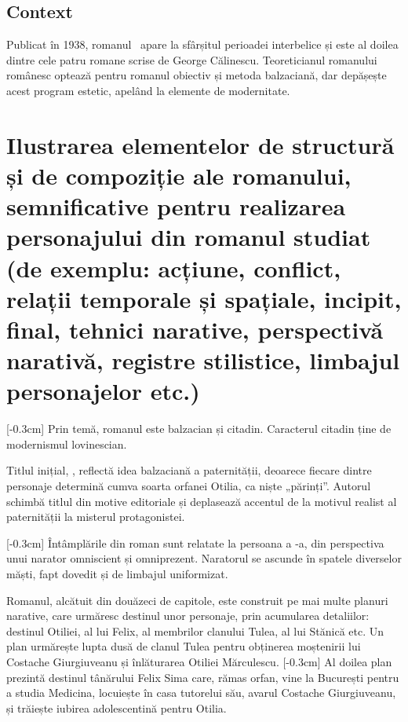 \renewcommand{\operatitle}{\textbfit{„Enigma Otiliei”}} %
\renewcommand{\operaauthor}{George Călinescu} %


\subsection{Context}

Publicat în 1938, romanul \operatitle\ apare la sfârșitul perioadei interbelice și este al doilea dintre cele patru romane scrise de \operaauthor. Teoreticianul romanului românesc optează pentru romanul obiectiv și metoda balzaciană, dar depășește acest program estetic, apelând la elemente de modernitate.


\section{Ilustrarea elementelor de structură și de compoziție ale romanului, semnificative pentru realizarea personajului din romanul studiat {\footnotesize\normalfont(de exemplu: acțiune, conflict, relații temporale și spațiale, incipit, final, tehnici narative, perspectivă narativă, registre stilistice, limbajul personajelor etc.)}}

[-0.3cm]
Prin temă, romanul este balzacian și citadin. Caracterul citadin ține de modernismul lovinescian.

Titlul inițial, , reflectă idea balzaciană a paternității, deoarece fiecare dintre personaje determină cumva soarta orfanei Otilia, ca niște „părinți”. Autorul schimbă titlul din motive editoriale și deplasează accentul de la motivul realist al paternității la misterul protagonistei.

[-0.3cm]
Întâmplările din roman sunt relatate la persoana a -a, din perspectiva unui narator omniscient și omniprezent. Naratorul se ascunde în spatele diverselor măști, fapt dovedit și de limbajul uniformizat.

Romanul, alcătuit din douăzeci de capitole, este construit pe mai multe planuri narative, care urmăresc destinul unor personaje, prin acumularea detaliilor: destinul Otiliei, al lui Felix, al membrilor clanului Tulea, al lui Stănică etc. Un plan urmărește lupta dusă de clanul Tulea pentru obținerea moștenirii lui Costache Giurgiuveanu și înlăturarea Otiliei Mărculescu.
[-0.3cm]
Al doilea plan prezintă destinul tânărului Felix Sima care, rămas orfan, vine la București pentru a studia Medicina, locuiește în casa tutorelui său, avarul Costache Giurgiuveanu, și trăiește iubirea adolescentină pentru Otilia.

